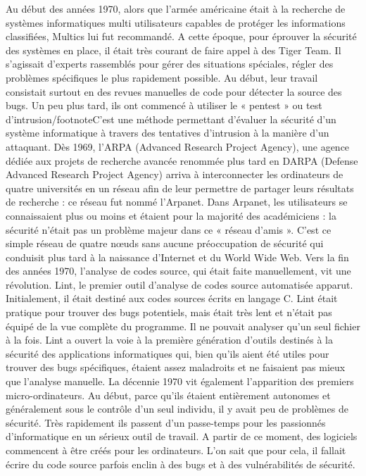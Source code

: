 Au début des années 1970, alors que l’armée américaine était à la recherche de systèmes informatiques multi utilisateurs capables de protéger les informations classifiées, Multics lui fut recommandé. 
A cette époque, pour éprouver la sécurité des systèmes en place, il était très courant de faire appel à des Tiger Team. Il s’agissait d’experts rassemblés pour gérer des situations spéciales, régler des problèmes spécifiques le plus rapidement possible. Au début, leur travail consistait surtout en des revues manuelles de code pour détecter la source des bugs. Un peu plus tard, ils ont commencé à utiliser le «  pentest » ou test d’intrusion/footnote{C’est une méthode permettant d’évaluer la sécurité d’un système informatique à travers des tentatives d’intrusion à la manière d’un attaquant.}
Dès 1969, l’ARPA (Advanced Research Project Agency), une agence dédiée aux projets de recherche avancée renommée plus tard en DARPA (Defense Advanced Research Project Agency) arriva à interconnecter les ordinateurs de quatre universités en un réseau afin de leur permettre de partager leurs résultats de recherche : ce réseau fut nommé l’Arpanet. Dans Arpanet, les utilisateurs se connaissaient plus ou moins et étaient pour la majorité des académiciens : la sécurité n’était pas un problème majeur dans ce « réseau d’amis ». C’est ce simple réseau de quatre nœuds sans aucune préoccupation de sécurité qui conduisit plus tard à la naissance d’Internet et du World Wide Web. 
Vers la fin des années 1970, l’analyse de codes source, qui était faite manuellement, vit une révolution. Lint, le premier outil d’analyse de codes source automatisée apparut. Initialement, il était destiné aux codes sources écrits en langage C. Lint était pratique pour trouver des bugs potentiels, mais était très lent et n'était pas équipé de la vue complète du programme. Il ne pouvait analyser qu'un seul fichier à la fois. Lint a ouvert la voie à la première génération d’outils destinés à la sécurité des applications informatiques qui, bien qu'ils aient été utiles pour trouver des bugs spécifiques, étaient assez maladroits et ne faisaient pas mieux que l'analyse manuelle.
La décennie 1970 vit également l’apparition des premiers micro-ordinateurs. Au début, parce qu’ils étaient entièrement autonomes et généralement sous le contrôle d'un seul individu, il y avait peu de problèmes de sécurité. Très rapidement ils passent d'un passe-temps pour les passionnés d'informatique en un sérieux outil de travail. A partir de ce moment, des logiciels commencent à être créés pour les ordinateurs. L’on sait que pour cela, il fallait écrire du code source parfois enclin à des bugs et à des vulnérabilités de sécurité.\\
